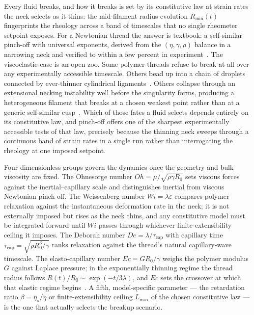 \documentclass[11pt]{article}
\begin{document}
Every fluid breaks, and how it breaks is set by its constitutive law at strain rates the neck selects as it thins: the mid-filament radius evolution $R_{\min}(t)$ fingerprints the rheology across a band of timescales that no single rheometer setpoint exposes. For a Newtonian thread the answer is textbook: a self-similar pinch-off with universal exponents, derived from the $(\eta, \gamma, \rho)$ balance in a narrowing neck and verified to within a few percent in experiment~\citep{eggers1993universalPinchOff,eggers2015singularities}. The viscoelastic case is an open zoo. Some polymer threads refuse to break at all over any experimentally accessible timescale. Others bead up into a chain of droplets connected by ever-thinner cylindrical ligaments~\citep{bhat2010beads}. Others collapse through an extensional necking instability well before the singularity forms, producing a heterogeneous filament that breaks at a chosen weakest point rather than at a generic self-similar cusp~\citep{fielding2011necking,hoyleFielding2016necking}. Which of those fates a fluid selects depends entirely on its constitutive law, and pinch-off offers one of the sharpest experimentally accessible tests of that law, precisely because the thinning neck sweeps through a continuous band of strain rates in a single run rather than interrogating the rheology at one imposed setpoint.

Four dimensionless groups govern the dynamics once the geometry and bulk viscosity are fixed. The Ohnesorge number $Oh = \mu/\sqrt{\rho\gamma R_0}$ sets viscous forces against the inertial--capillary scale and distinguishes inertial from viscous Newtonian pinch-off. The Weissenberg number $Wi = \lambda\dot\varepsilon$ compares polymer relaxation against the instantaneous deformation rate in the neck; it is not externally imposed but rises as the neck thins, and any constitutive model must be integrated forward until $Wi$ passes through whichever finite-extensibility ceiling it imposes. The Deborah number $De = \lambda/\tau_{\mathrm{cap}}$ with capillary time $\tau_{\mathrm{cap}} = \sqrt{\rho R_0^3/\gamma}$ ranks relaxation against the thread's natural capillary-wave timescale. The elasto-capillary number $Ec = G R_0/\gamma$ weighs the polymer modulus $G$ against Laplace pressure; in the exponentially thinning regime the thread radius follows $R(t)/R_0 \sim \exp(-t/3\lambda)$, and $Ec$ sets the crossover at which that elastic regime begins~\citep{entovHinch1997}. A fifth, model-specific parameter --- the retardation ratio $\beta = \eta_s/\eta$ or finite-extensibility ceiling $L_{\max}$ of the chosen constitutive law --- is the one that actually selects the breakup scenario.
\end{document}
